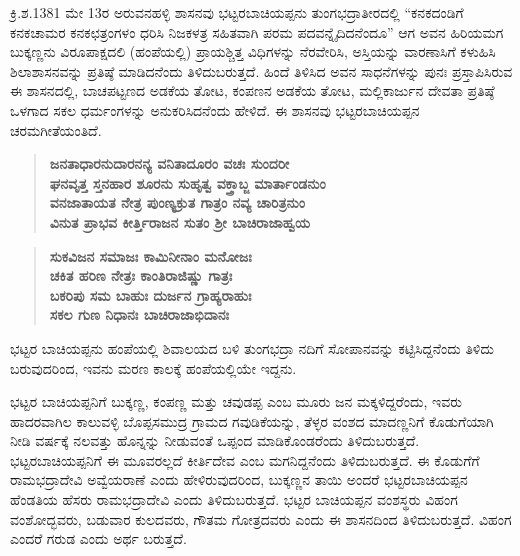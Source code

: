 ಕ್ರಿ.ಶ.1381 ಮೇ 13ರ ಅರುವನಹಳ್ಳಿ ಶಾಸನವು ಭಟ್ಟರಬಾಚಿಯಪ್ಪನು ತುಂಗಭದ್ರಾತೀರದಲ್ಲಿ “ಕನಕದಂಡಿಗೆ ಕನಕಚಾಮರ ಕನಕಛತ್ರಂಗಳಂ ಧರಿಸಿ ನಿಜಕಳತ್ರ ಸಹಿತವಾಗಿ ಪರಮ ಪದವನ್ನೈದಿದನೆಂದೂ” ಆಗ ಅವನ ಹಿರಿಯಮಗ ಬುಕ್ಕಣ್ಣನು ವಿರೂಪಾಕ್ಷದಲಿ (ಹಂಪೆಯಲ್ಲಿ) ಪ್ರಾಯಶ್ಚಿತ್ತ ವಿಧಿಗಳನ್ನು ನೆರವೇರಿಸಿ, ಅಸ್ತಿಯನ್ನು ವಾರಣಾಸಿಗೆ ಕಳುಹಿಸಿ ಶಿಲಾಶಾಸನವನ್ನು ಪ್ರತಿಷ್ಠೆ ಮಾಡಿದನೆಂದು ತಿಳಿದುಬರುತ್ತದೆ. ಹಿಂದೆ ತಿಳಿಸಿದ ಅವನ ಸಾಧನೆಗಳನ್ನು ಪುನಃ ಪ್ರಸ್ತಾಪಿಸಿರುವ ಈ ಶಾಸನದಲ್ಲಿ, ಬಾಚಪಟ್ಟಣದ ಅಡಕೆಯ ತೋಟ, ಕಂಪಣನ ಅಡಕೆಯ ತೋಟ, ಮಲ್ಲಿಕಾರ್ಜುನ ದೇವತಾ ಪ್ರತಿಷ್ಠೆ ಒಳಗಾದ ಸಕಲ ಧರ್ಮಂಗಳನ್ನು ಅನುಕರಿಸಿದನೆಂದು ಹೇಳಿದೆ. ಈ ಶಾಸನವು ಭಟ್ಟರಬಾಚಿಯಪ್ಪನ ಚರಮಗೀತೆಯಂತಿದೆ.

\begin{verse}
\textbf{ಜನತಾಧಾರನುದಾರನನ್ಯ ವನಿತಾದೂರಂ ವಚಃ ಸುಂದರೀ} \\\textbf{ಘನವೃತ್ತ ಸ್ತನಹಾರ ಶೂರನು ಸುಹೃತ್ವ ವಕ್ತ್ರಾಬ್ಜ ಮಾರ್ತಾಂಡನುಂ} \\\textbf{ವನಜಾತಾಯತ ನೇತ್ರ ಪುಂಣ್ಯಕ್ರುತ ಗಾತ್ರಂ ನವ್ಯ ಚಾರಿತ್ರನುಂ} \\\textbf{ವಿನುತ ಪ್ರಾಭವ ಕೀರ್ತ್ತಿರಾಜನ ಸುತಂ ಶ‍್ರೀ ಬಾಚಿರಾಜಾಹ್ವಯ}
\end{verse}

\begin{verse}
\textbf{ಸುಕವಿಜನ ಸಮಾಜಃ ಕಾಮಿನೀನಾಂ ಮನೋಜಃ} \\\textbf{ಚಕಿತ ಹರಿಣ ನೇತ್ರಃ ಕಾಂತಿರಾಜಿಷ್ಣು ಗಾತ್ರಃ} \\\textbf{ಬಕರಿಪು ಸಮ ಬಾಹುಃ ದುರ್ಜನ ಗ್ರಾಹ್ಯರಾಹುಃ} \\\textbf{ಸಕಲ ಗುಣ ನಿಧಾನಃ ಬಾಚಿರಾಜಾಭಿದಾನಃ}
\end{verse}

ಭಟ್ಟರ ಬಾಚಿಯಪ್ಪನು ಹಂಪೆಯಲ್ಲಿ ಶಿವಾಲಯದ ಬಳಿ ತುಂಗಭದ್ರಾ ನದಿಗೆ ಸೋಪಾನವನ್ನು ಕಟ್ಟಿಸಿದ್ದನೆಂದು ತಿಳಿದು ಬರುವುದರಿಂದ, ಇವನು ಮರಣ ಕಾಲಕ್ಕೆ ಹಂಪೆಯಲ್ಲಿಯೇ ಇದ್ದನು.

ಭಟ್ಟರ ಬಾಚಿಯಪ್ಪನಿಗೆ ಬುಕ್ಕಣ್ಣ, ಕಂಪಣ್ಣ ಮತ್ತು ಚವುಡಪ್ಪ ಎಂಬ ಮೂರು ಜನ ಮಕ್ಕಳಿದ್ದರೆಂದು, ಇವರು ಹಾದರವಾಗಿಲ ಕಾಲುವಳ್ಳಿ ಬೊಪ್ಪಸಮುದ್ರ ಗ್ರಾಮದ ಗವುಡಿಕೆಯನ್ನು, ತೆಳ್ಳರ ವಂಶದ ಮಾದಣ್ಣನಿಗೆ ಕೊಡುಗೆಯಾಗಿ ನೀಡಿ ವರ್ಷಕ್ಕೆ ನಲವತ್ತು ಹೊನ್ನನ್ನು ನೀಡುವಂತೆ ಒಪ್ಪಂದ ಮಾಡಿಕೊಂಡರೆಂದು ತಿಳಿದುಬರುತ್ತದೆ. ಭಟ್ಟರಬಾಚಿಯಪ್ಪನಿಗೆ ಈ ಮೂವರಲ್ಲದೆ ಕೀರ್ತಿದೇವ ಎಂಬ ಮಗನಿದ್ದನೆಂದು ತಿಳಿದುಬರುತ್ತದೆ. ಈ ಕೊಡುಗೆಗೆ ರಾಮಭದ್ರಾದೇವಿ ಅವ್ವೆಯರಾಣೆ ಎಂದು ಹೇಳಿರುವುದರಿಂದ, ಬುಕ್ಕಣ್ಣನ ತಾಯಿ ಅಂದರೆ ಭಟ್ಟರಬಾಚಿಯಪ್ಪನ ಹೆಂಡತಿಯ ಹೆಸರು ರಾಮಭದ್ರಾದೇವಿ ಎಂದು ತಿಳಿದುಬರುತ್ತದೆ. ಭಟ್ಟರ ಬಾಚಿಯಪ್ಪನ ವಂಶಸ್ಥರು ವಿಹಂಗ ವಂಶೋದ್ಭವರು, ಬಡುವಾರ ಕುಲದವರು, ಗೌತಮ ಗೋತ್ರದವರು ಎಂದು ಈ ಶಾಸನದಿಂದ ತಿಳಿದುಬರುತ್ತದೆ. ವಿಹಂಗ ಎಂದರೆ ಗರುಡ ಎಂದು ಅರ್ಥ ಬರುತ್ತದೆ.

